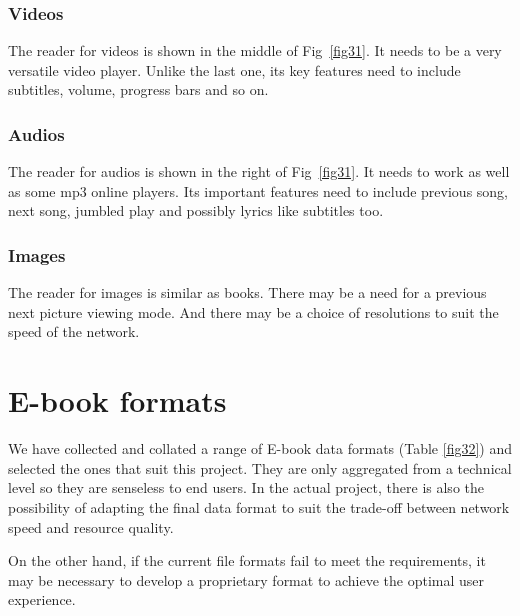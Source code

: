 \subsubsection{Videos}

The reader for videos is shown in the middle of Fig~\ref{fig31}. 
It needs to be a very versatile video player. 
Unlike the last one, its key features need to include subtitles, volume, progress bars and so on.

\subsubsection{Audios} 

The reader for audios is shown in the right of Fig~\ref{fig31}. 
It needs to work as well as some mp3 online players. 
Its important features need to include previous song, next song, jumbled play and possibly lyrics like subtitles too.

\subsubsection{Images}

The reader for images is similar as books. 
There may be a need for a previous next picture viewing mode.
And there may be a choice of resolutions to suit the speed of the network.

\section{E-book formats}
We have collected and collated a range of E-book data formats (Table \ref{fig32}) and selected the ones that suit this project.
They are only aggregated from a technical level so they are senseless to end users. 
In the actual project, there is also the possibility of adapting the final data format to suit the trade-off between network speed and resource quality.

On the other hand, if the current file formats fail to meet the requirements, it may be necessary to develop a proprietary format to achieve the optimal user experience.

